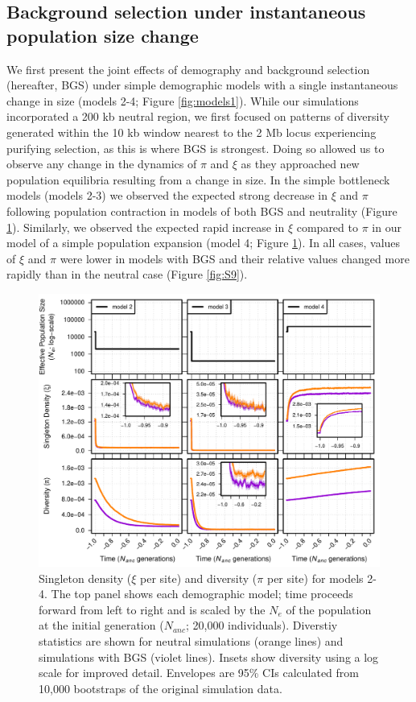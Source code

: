 \documentclass[9pt,twocolumn,twoside]{rilabRxiv}
\begin{document}
\subsection{Background selection under instantaneous population size change}

We first present the joint effects of demography and background selection (hereafter, BGS) under simple demographic models with a single instantaneous change in size (models 2-4; Figure \ref{fig:models1}).
While our simulations incorporated a 200 kb neutral region, we first focused on patterns of diversity generated within the 10 kb window nearest to the 2 Mb locus experiencing purifying selection, as this is where BGS is strongest.
Doing so allowed us to observe any change in the dynamics of $\pi$ and $\xi$ as they approached new population equilibria resulting from a change in size.
In the simple bottleneck models (models 2-3) we observed the expected strong decrease in $\xi$ and $\pi$ following  population contraction in models of both BGS and neutrality (Figure \ref{fig:S6}).
Similarly, we observed the expected rapid increase in $\xi$ compared to $\pi$ in our model of a simple population expansion (model 4; Figure \ref{fig:S6}).
In all cases, values of $\xi$ and $\pi$ were lower in models with BGS and their relative values changed more rapidly than in the neutral case (Figure \ref{fig:S9}).

\begin{figure}[]
\includegraphics[width=\linewidth]{figures/FigS6_new.pdf}
\caption{Singleton density ($\xi$ per site) and diversity ($\pi$ per site) for models 2-4.
The top panel shows each demographic model; time proceeds forward from left to right and is scaled by the $N_e$ of the population at the initial generation ($N_{anc}$; 20,000 individuals).
Diverstiy statistics are shown for neutral simulations (orange lines) and simulations with BGS (violet lines).
Insets show diversity using a log scale for improved detail.
Envelopes are 95\% CIs calculated from 10,000 bootstraps of the original simulation data.}
\label{fig:S6}
\end{figure}
\end{document}
